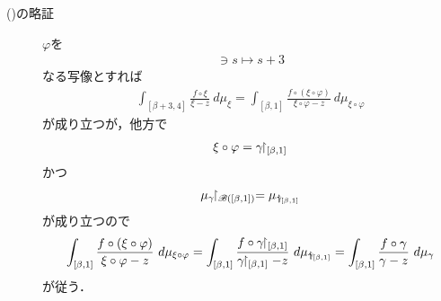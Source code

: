 \begin{description}
		\item[()の略証]
			$\varphi$を
			\begin{align}
				[\beta,1] \ni s \longmapsto s + 3
			\end{align}
			なる写像とすれば
			\begin{align}
				\int_{[\beta+3,4]} \frac{f \circ \xi}{\xi - z}\ d\mu_{\xi}
				= \int_{[\beta,1]} \frac{f \circ (\xi \circ \varphi)}{\xi \circ \varphi - z}\ d\mu_{\xi \circ \varphi}
			\end{align}
			が成り立つが，他方で
			\begin{align}
				\xi \circ \varphi = \gamma \hspace{-0.41em}\upharpoonright_{[\beta,1]}
			\end{align}
			かつ
			\begin{align}
				\mu_{\gamma} \hspace{-0.41em}\upharpoonright_{\mathscr{B}([\beta,1])} = \mu_{\gamma \hspace{-0.41em}\upharpoonright_{[\beta,1]}}
			\end{align}
			が成り立つので
			\begin{align}
				\int_{[\beta,1]} \frac{f \circ (\xi \circ \varphi)}{\xi \circ \varphi - z}\ d\mu_{\xi \circ \varphi}
				= \int_{[\beta,1]} \frac{f \circ \gamma \rest_{[\beta,1]}}{\gamma \rest_{[\beta,1]} - z}\ d\mu_{\gamma \rest_{[\beta,1]}}
				= \int_{[\beta,1]} \frac{f \circ \gamma}{\gamma - z}\ d\mu_{\gamma}
			\end{align}
			が従う．
	\end{description}